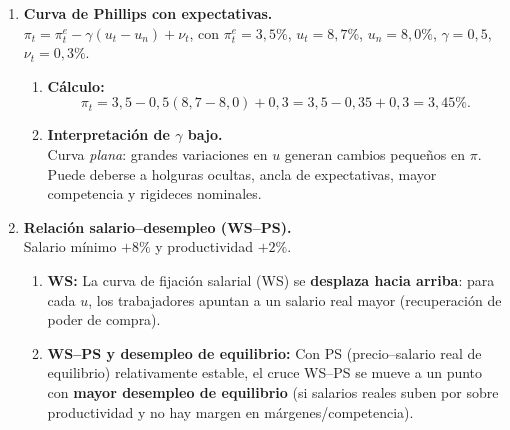 \documentclass[11pt,addpoints]{article}
\begin{document}
\begin{enumerate}
\item \textbf{Curva de Phillips con expectativas.} \\
$\pi_t=\pi_t^e-\gamma(u_t-u_n)+\nu_t$, con $\pi_t^e=3{,}5\%$, $u_t=8{,}7\%$, $u_n=8{,}0\%$, $\gamma=0{,}5$, $\nu_t=0{,}3\%$.
\begin{enumerate}[label=(\alph*)]
\item \textbf{Cálculo:}
\[
\pi_t=3{,}5-0{,}5(8{,}7-8{,}0)+0{,}3=3{,}5-0{,}35+0{,}3=3{,}45\%.
\]
\item \textbf{Interpretación de $\gamma$ bajo.} \\
Curva \emph{plana}: grandes variaciones en $u$ generan cambios pequeños en $\pi$. Puede deberse a holguras ocultas, ancla de expectativas, mayor competencia y rigideces nominales.
\end{enumerate}

\item \textbf{Relación salario--desempleo (WS--PS).} \\
Salario mínimo $+8\%$ y productividad $+2\%$.
\begin{enumerate}[label=(\alph*)]
\item \textbf{WS:} La curva de fijación salarial (WS) se \textbf{desplaza hacia arriba}: para cada $u$, los trabajadores apuntan a un salario real mayor (recuperación de poder de compra). \\
\item \textbf{WS--PS y desempleo de equilibrio:} Con PS (precio–salario real de equilibrio) relativamente estable, el cruce WS--PS se mueve a un punto con \textbf{mayor desempleo de equilibrio} (si salarios reales suben por sobre productividad y no hay margen en márgenes/competencia).
\end{enumerate}


\end{enumerate}
\end{document}
